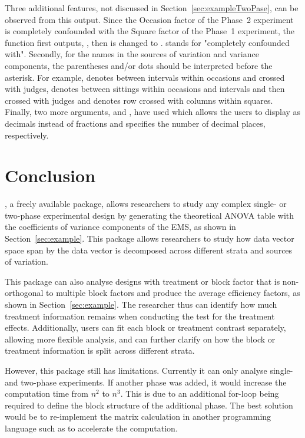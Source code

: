 \documentclass[article]{jss}
\begin{document}
Three additional features, not discussed in Section~\ref{sec:exampleTwoPase}, can be observed from this output. Since the Occasion factor of the Phase~2 experiment is completely confounded with the Square factor of the Phase~1 experiment, the function first outputs, , then  is changed to .  stands for "completely confounded with". Secondly, for the names in the sources of variation and variance components, the parentheses and/or dots should be interpreted before the asterisk. For example,  denotes between intervals within occasions and crossed with judges,  denotes between sittings within occasions and intervals and then crossed with judges and  denotes row crossed with columns within squares. Finally, two more arguments,  and , have used which allows the users to display as decimals instead of fractions and specifies the number of decimal places, respectively. 


\section[Conclusion]{Conclusion}
, a freely available  package, allows researchers to study any complex single- or two-phase experimental design by generating the theoretical ANOVA table with the coefficients of variance components of the EMS, as shown in Section~\ref{sec:example}. This package allows researchers to study how data vector space span by the data vector is decomposed across different strata and sources of variation.

This package can also analyse designs with treatment or block factor that is non-orthogonal to multiple block factors and produce the average efficiency factors, as shown in Section~\ref{sec:example}. The researcher thus can identify how much treatment information remains when conducting the test for the treatment effects. Additionally, users can fit each block or treatment contrast separately, allowing more flexible analysis, and can further clarify on how the block or treatment information is split across different strata.

However, this package still has limitations. Currently it can only analyse single- and two-phase experiments. If another phase was added, it would increase the computation time from $n^2$ to $n^3$. This is due to an additional for-loop being required to define the block structure of the additional phase. The best solution would be to re-implement the matrix calculation in another programming language such as  to accelerate the computation.
\end{document}
